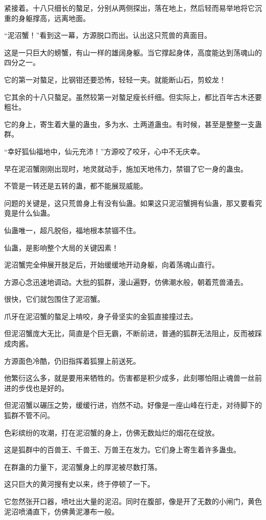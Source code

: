 \begin{this_body}
紧接着。十八只细长的螯足，分别从两侧探出，落在地上，然后轻而易举地将它沉重的身躯撑高，远离地面。

“泥沼蟹！”看到这一幕，方源脱口而出。认出这只荒兽的真面目。

这是一只巨大的螃蟹，有山一样的雄阔身躯。当它撑起身体，高度能达到荡魂山的四分之一。

它的第一对螯足，比钢钳还要恐怖，轻轻一夹。就能断山石，剪蛟龙！

它其余的十八只螯足。虽然较第一对螯足瘦长纤细。但实际上，都比百年古木还要粗壮。

它的身上，寄生着大量的蛊虫，多为水、土两道蛊虫。有时候，甚至是整整一支蛊群。

“幸好狐仙福地中，仙元充沛！”方源咬了咬牙，心中不无庆幸。

早在泥沼蟹刚刚出现时，地灵就动手，施加天地伟力，禁锢了它一身的蛊虫。

不管是一转还是五转的蛊，都不能展现威能。

问题的关键是，这只荒兽身上有没有仙蛊。如果这只泥沼蟹拥有仙蛊，那又要看究竟是什么仙蛊。

仙蛊唯一，超凡脱俗，福地根本禁锢不住。

仙蛊，是影响整个大局的关键因素！

泥沼蟹完全伸展开肢足后，开始缓缓地开动身躯，向着荡魂山直行。

方源心念迅速地调动。大批的狐群，漫山遍野，仿佛潮水般，朝着荒兽涌去。

很快，它们就包围住了泥沼蟹。

爪牙在泥沼蟹的螯足上啃咬，身子骨坚实的金狐直接撞过去。

但泥沼蟹庞大无比，简直是个巨无霸，不断前进，普通的狐群无法阻止，反而被踩成肉酱。

方源面色冷酷，仍旧指挥着狐狸上前送死。

他繁衍这么多，就是要用来牺牲的。伤害都是积少成多，此刻哪怕阻止魂兽一丝前进的步伐也是好的。

但泥沼蟹以碾压之势，缓缓行进，岿然不动。好像是一座山峰在行走，对待脚下的狐群不管不问。

色彩缤纷的攻潮，打在泥沼蟹的身上，仿佛无数灿烂的烟花在绽放。

这是狐群中的百兽王、千兽王、万兽王在发力。它们身上寄生着许多蛊虫。

在群蛊的力量下，泥沼蟹身上的厚泥被尽数打落。

这只巨大的黄河搜有史以来，终于停顿了一下。

它忽然张开口器，喷吐出大量的泥沼。同时在腹部，像是开了无数的小闸门，黄色泥沼喷涌直下，仿佛黄泥瀑布一般。


\end{this_body}
